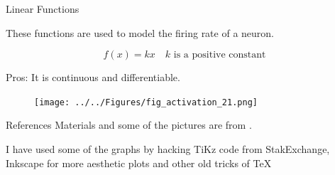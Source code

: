 \documentclass{beamer}
\begin{document}
	\begin{frame}{Linear Functions}
		
		These functions are used to model the firing rate of a neuron.
		
		\begin{equation*}
			f(x)= kx \quad k \text{ is a positive constant}
		\end{equation*}
		
		Pros: It is continuous and differentiable.	
		
		\begin{figure}[h]
			\centering
			\texttt{[image: ../../Figures/fig\_activation\_21.png]}
		\end{figure}
		
		
	\end{frame}

\begin{frame}{References}
	Materials and some of the pictures are from \citep{calin}.
	\printbibliography 	
	
	I have used some of the graphs by hacking TiKz code from StakExchange, Inkscape for more aesthetic plots and other old tricks of \TeX
	
\end{frame}
\end{document}
